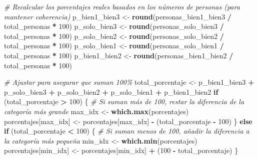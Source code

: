 \documentclass[
]{article}
\newenvironment{Shaded}{\begin{snugshade}}{\end{snugshade}}
\newcommand{\CommentTok}[1]{\textcolor[rgb]{0.56,0.35,0.01}{\textit{#1}}}
\newcommand{\ControlFlowTok}[1]{\textcolor[rgb]{0.13,0.29,0.53}{\textbf{#1}}}
\newcommand{\DecValTok}[1]{\textcolor[rgb]{0.00,0.00,0.81}{#1}}
\newcommand{\FunctionTok}[1]{\textcolor[rgb]{0.13,0.29,0.53}{\textbf{#1}}}
\newcommand{\NormalTok}[1]{#1}
\newcommand{\OtherTok}[1]{\textcolor[rgb]{0.56,0.35,0.01}{#1}}
\newcommand{\SpecialCharTok}[1]{\textcolor[rgb]{0.81,0.36,0.00}{\textbf{#1}}}
\begin{document}
\begin{Shaded}
\begin{Highlighting}[]
\CommentTok{\# Recalcular los porcentajes reales basados en los números de personas (para mantener coherencia)}
\NormalTok{p\_bien1\_bien3 }\OtherTok{\textless{}{-}} \FunctionTok{round}\NormalTok{(personas\_bien1\_bien3 }\SpecialCharTok{/}\NormalTok{ total\_personas }\SpecialCharTok{*} \DecValTok{100}\NormalTok{)}
\NormalTok{p\_solo\_bien3 }\OtherTok{\textless{}{-}} \FunctionTok{round}\NormalTok{(personas\_solo\_bien3 }\SpecialCharTok{/}\NormalTok{ total\_personas }\SpecialCharTok{*} \DecValTok{100}\NormalTok{)}
\NormalTok{p\_solo\_bien2 }\OtherTok{\textless{}{-}} \FunctionTok{round}\NormalTok{(personas\_solo\_bien2 }\SpecialCharTok{/}\NormalTok{ total\_personas }\SpecialCharTok{*} \DecValTok{100}\NormalTok{)}
\NormalTok{p\_solo\_bien1 }\OtherTok{\textless{}{-}} \FunctionTok{round}\NormalTok{(personas\_solo\_bien1 }\SpecialCharTok{/}\NormalTok{ total\_personas }\SpecialCharTok{*} \DecValTok{100}\NormalTok{)}
\NormalTok{p\_bien1\_bien2 }\OtherTok{\textless{}{-}} \FunctionTok{round}\NormalTok{(personas\_bien1\_bien2 }\SpecialCharTok{/}\NormalTok{ total\_personas }\SpecialCharTok{*} \DecValTok{100}\NormalTok{)}

\CommentTok{\# Ajustar para asegurar que suman 100\%}
\NormalTok{total\_porcentaje }\OtherTok{\textless{}{-}}\NormalTok{ p\_bien1\_bien3 }\SpecialCharTok{+}\NormalTok{ p\_solo\_bien3 }\SpecialCharTok{+}\NormalTok{ p\_solo\_bien2 }\SpecialCharTok{+}\NormalTok{ p\_solo\_bien1 }\SpecialCharTok{+}\NormalTok{ p\_bien1\_bien2}
\ControlFlowTok{if}\NormalTok{ (total\_porcentaje }\SpecialCharTok{\textgreater{}} \DecValTok{100}\NormalTok{) \{}
  \CommentTok{\# Si suman más de 100, restar la diferencia de la categoría más grande}
\NormalTok{  max\_idx }\OtherTok{\textless{}{-}} \FunctionTok{which.max}\NormalTok{(porcentajes)}
\NormalTok{  porcentajes[max\_idx] }\OtherTok{\textless{}{-}}\NormalTok{ porcentajes[max\_idx] }\SpecialCharTok{{-}}\NormalTok{ (total\_porcentaje }\SpecialCharTok{{-}} \DecValTok{100}\NormalTok{)}
\NormalTok{\} }\ControlFlowTok{else} \ControlFlowTok{if}\NormalTok{ (total\_porcentaje }\SpecialCharTok{\textless{}} \DecValTok{100}\NormalTok{) \{}
  \CommentTok{\# Si suman menos de 100, añadir la diferencia a la categoría más pequeña}
\NormalTok{  min\_idx }\OtherTok{\textless{}{-}} \FunctionTok{which.min}\NormalTok{(porcentajes)}
\NormalTok{  porcentajes[min\_idx] }\OtherTok{\textless{}{-}}\NormalTok{ porcentajes[min\_idx] }\SpecialCharTok{+}\NormalTok{ (}\DecValTok{100} \SpecialCharTok{{-}}\NormalTok{ total\_porcentaje)}
\NormalTok{\}}


\end{Highlighting}
\end{Shaded}
\end{document}

